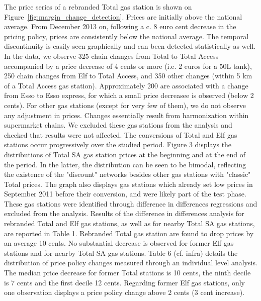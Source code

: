 \documentclass[english]{article}
\begin{document}
The price series of a rebranded Total gas station is shown on Figure~\ref{fig:margin_change_detection}. Prices are initially above the national average. From December 2013 on,
following a c. 8 euro cent decrease in the pricing policy, prices are consistently below the national average. The temporal discontinuity is easily seen graphically and can been detected statistically as well. In the data, we observe 325 chain changes from Total to Total Access accompanied by a price decrease of 4 cents or more (i.e. 2 euros for a 50L tank), 250 chain changes from Elf to Total Access, and 350 other changes (within 5 km of a Total Access gas station). Approximately 200  are associated with a change from Esso to Esso express, for which a small price decreasee is observed (below 2 cents). For other gas
stations (except for very few of them), we do not observe any adjustment in prices. Changes essentially result from harmonization within supermarket chains. We excluded these gas stations from the analysis and checked that results were not affected. The conversions of Total and Elf gas stations occur progressively over the studied period. Figure 3 displays the distributions of Total SA gas station prices at the beginning and at the end of the period. In the latter, the distribution can be seen to be bimodal, reflecting the existence of the "discount" networks besides other gas stations with "classic" Total prices. The graph also displays gas stations which already set low prices in September 2011 before their conversion, and were likely part of the test phase. These gas stations were identified through difference in differences regressions and excluded from the analysis. Results of the difference in differences analysis for rebranded Total
and Elf gas stations, as well as for nearby Total SA gas stations, are reported in Table 1. Rebranded Total gas station are found to drop prices by an average 10 cents. No substantial decrease is observed for former Elf gas stations and for nearby Total SA gas
stations. Table 6 (cf. infra) details the distribution of price policy changes measured through an individual level analysis. The median price decrease for former Total stations is 10 cents, the ninth decile is 7 cents and the first decile 12 cents. Regarding former Elf gas stations, only one observation displays a price policy change above 2 cents (3 cent increase).
\end{document}
